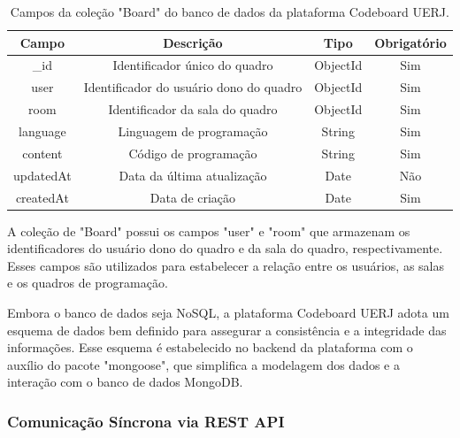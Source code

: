 \begin{table}[H]
    \centering
    \renewcommand{\arraystretch}{1.3} 
    \begin{tabular}{|c|c|c|c|}
        \hline
        \textbf{Campo} & \textbf{Descrição}             & \textbf{Tipo} & \textbf{Obrigatório} \\
        \hline
        \_id           & Identificador único do quadro  & ObjectId      & Sim                  \\
        \hline
        user         & Identificador do usuário dono do quadro & ObjectId      & Sim                  \\
        \hline
        room         & Identificador da sala do quadro & ObjectId      & Sim                  \\
        \hline
        language       & Linguagem de programação       & String        & Sim                  \\
        \hline
        content           & Código de programação          & String        & Sim                  \\
        \hline
        updatedAt      & Data da última atualização      & Date          & Não                  \\
        \hline
        createdAt      & Data de criação      & Date          & Sim                  \\
        \hline
    \end{tabular}
    \caption{Campos da coleção "Board" do banco de dados da plataforma Codeboard UERJ.}
    \label{tab:board-collection-fields}
\end{table}

A coleção de "Board" possui os campos "user" e "room" que armazenam os identificadores do usuário dono do quadro e da sala do quadro, respectivamente. Esses campos são utilizados para estabelecer a relação entre os usuários, as salas e os quadros de programação.


Embora o banco de dados seja NoSQL, a plataforma Codeboard UERJ adota um esquema de dados bem definido para assegurar a consistência e a integridade das informações. Esse esquema é estabelecido no backend da plataforma com o auxílio do pacote "mongoose", que simplifica a modelagem dos dados e a interação com o banco de dados MongoDB.

\subsubsection{Comunicação Síncrona via REST API}

